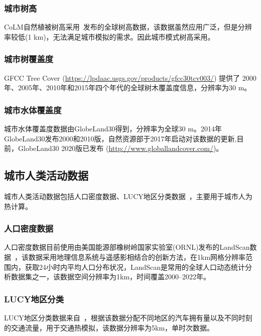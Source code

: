 \subsubsection{城市树高}\label{城市树高数据}
CoLM自然植被树高采用~\citet{simard2011mapping}发布的全球树高数据，该数据虽然应用广泛，但是分辨率较低(1 km)，无法满足城市模拟的需求。因此城市模式树高采用\citet{lang2023high}。

\subsubsection{城市树覆盖度}
GFCC Tree Cover (\url{https://lpdaac.usgs.gov/products/gfcc30tcv003/}) 提供了
2000年、2005年、2010年和2015年四个年代的全球树木覆盖度信息，分辨率为30 m。

\subsubsection{城市水体覆盖度}\label{城市水体覆盖度}
城市水体覆盖度数据由GlobeLand30得到，分辨率为全球30 m。2014年GlobeLand30发布2000和2010版，自然资源部于2017年启动对该数据的更新,目前，GlobeLand30 2020版已发布 (\url{http://www.globallandcover.com/})。


\subsection{城市人类活动数据}\label{城市人类活动数据}

城市人类活动数据包括人口密度数据、LUCY地区分类数据~\citep{allen2011}，主要用于城市人为热计算。

\subsubsection{人口密度数据}\label{人口密度数据}
人口密度数据目前使用由美国能源部橡树岭国家实验室(ORNL)发布的LandScan数据~\citep{brightLandScanGlobal20002001}，该数据采用地理信息系统与遥感影相结合的创新方法，在1km网格分辨率范围内，获取24小时内平均人口分布状况，LandScan是常用的全球人口动态统计分析数据集之一，该数据空间分辨率为1km，时间覆盖2000--2022年。

\subsubsection{LUCY地区分类}\label{LUCY地区分类}
LUCY地区分类数据来自~\citet{allen2011}，根据该数据分配不同地区的汽车拥有量以及不同时刻的交通流量，用于交通热模拟，该数据分辨率为5km，单时次数据。


